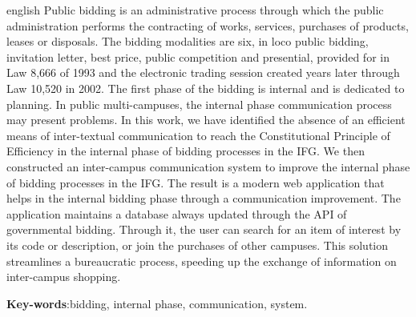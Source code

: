 \begin{resumo}[Abstract]
 \begin{otherlanguage*}{english}
Public bidding is an administrative process through which the public administration performs the contracting of works, services, purchases of products, leases or disposals.
The bidding modalities are six, in loco public bidding, invitation letter, best price, public competition and presential, provided for in Law 8,666 of 1993 and the electronic trading session created years later through Law 10,520 in 2002.
The first phase of the bidding is internal and is dedicated to planning.
In public multi-campuses, the internal phase communication process may present problems.
In this work, we have identified the absence of an efficient means of inter-textual communication to reach the Constitutional Principle of Efficiency in the internal phase of bidding processes in the IFG.
We then constructed an inter-campus communication system to improve the internal phase of bidding processes in the IFG.
The result is a modern web application that helps in the internal bidding phase through a communication improvement.
The application maintains a database always updated through the API of governmental bidding.
Through it, the user can search for an item of interest by its code or description, or join the purchases of other campuses.
This solution streamlines a bureaucratic process, speeding up the exchange of information on inter-campus shopping.

   \vspace{\onelineskip}
 
   \noindent 
   \textbf{Key-words}:bidding, internal phase, communication, system.
 \end{otherlanguage*}
\end{resumo}
